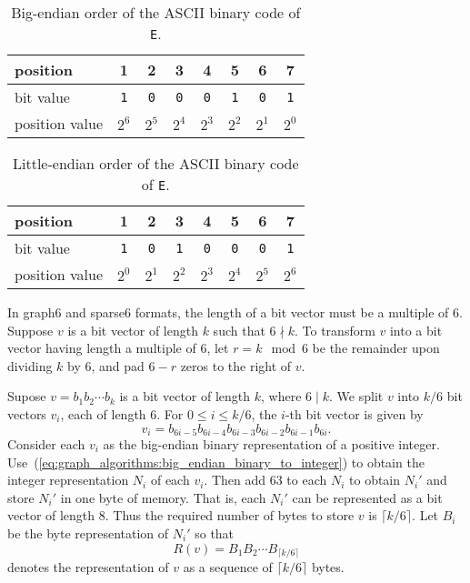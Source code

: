 \begin{table}[!htbp]
\centering
\begin{tabular}{|l|ccccccc|} \hline
position       & 1          & 2          & 3          & 4          & 5          & 6          & 7 \\\hline
bit value      & \texttt{1} & \texttt{0} & \texttt{0} & \texttt{0} & \texttt{1} & \texttt{0} & \texttt{1} \\\hline
position value & $2^6$      & $2^5$      & $2^4$      & $2^3$      & $2^2$      & $2^1$      & $2^0$ \\\hline
\end{tabular}
\caption{Big-endian order of the ASCII binary code of \texttt{E}.}
\label{tab:graph_algorithms:big_endian_ASCII_binary_E}
\end{table}

\begin{table}[!htbp]
\centering
\begin{tabular}{|l|ccccccc|} \hline
position       & 1          & 2          & 3          & 4          & 5          & 6          & 7 \\\hline
bit value      & \texttt{1} & \texttt{0} & \texttt{1} & \texttt{0} & \texttt{0} & \texttt{0} & \texttt{1} \\\hline
position value & $2^0$      & $2^1$      & $2^2$      & $2^3$      & $2^4$      & $2^5$      & $2^6$ \\\hline
\end{tabular}
\caption{Little-endian order of the ASCII binary code of \texttt{E}.}
\label{tab:graph_algorithms:little_endian_ASCII_binary_E}
\end{table}

In graph6 and sparse6 formats, the length of a bit vector must be a
multiple of 6. Suppose $v$ is a bit vector of length $k$ such that
$6 \nmid k$. To transform $v$ into a bit vector having length a
multiple of 6, let $r = k \mod 6$ be the remainder upon dividing $k$
by 6, and pad $6 - r$ zeros to the right of $v$.

Supose $v = b_1 b_2 \cdots b_k$ is a bit vector of length $k$, where
$6 \;|\; k$. We split $v$ into $k/6$ bit vectors $v_i$, each of length
6. For $0 \leq i \leq k/6$, the $i$-th bit vector is given by
\[
v_i
=
b_{6i-5} b_{6i-4} b_{6i-3} b_{6i-2} b_{6i-1} b_{6i}.
\]
Consider each $v_i$ as the big-endian binary representation of a
positive
integer. Use~(\ref{eq:graph_algorithms:big_endian_binary_to_integer})
to obtain the integer representation $N_i$ of each $v_i$. Then add 63
to each $N_i$ to obtain $N_i'$ and store $N_i'$ in one byte of
memory. That is, each $N_i'$ can be represented as a bit vector of
length $8$. Thus the required number of bytes to store $v$ is
$\lceil k/6 \rceil$. Let $B_i$ be the byte representation of $N_i'$ so
that
%
\begin{equation}
\label{eq:graph_algorithms:byte_representation_bit_vector}
R(v)
=
B_1 B_2 \cdots B_{\lceil k/6 \rceil}
\end{equation}
%
denotes the representation of $v$ as a sequence of $\lceil k/6 \rceil$
bytes.


